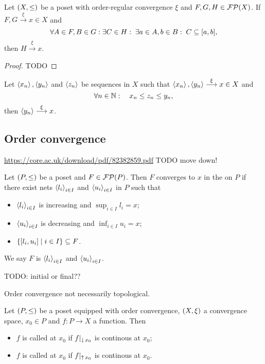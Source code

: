 \begin{proposition}
Let $\sSet{X,\leq}$ be a poset with order-regular convergence $\xi$ and $F,G,H\in \operatorname{\mathcal{FP}}(X)$. If $F,G\overset{\xi}{\longrightarrow} x\in X$ and
\[ \forall A\in F,B\in G: \exists C\in H: \;\exists a\in A, b\in B:\; C\subseteq \interval{a,b},  \]
then $H\overset{\xi}{\longrightarrow} x$.
\end{proposition}
\begin{proof}
TODO
\end{proof}
\begin{corollary}
Let $\left\langle x_n \right\rangle, \left\langle y_n \right\rangle$ and $\left\langle z_n \right\rangle$ be sequences in $X$ such that $\left\langle x_n \right\rangle, \left\langle y_n \right\rangle\overset{\xi}{\longrightarrow} x\in X$ and
\[ \forall n\in \mathbb{N}: \quad x_n \leq z_n \leq y_n, \]
then $\left\langle y_n \right\rangle \overset{\xi}{\longrightarrow} x$.
\end{corollary}

\subsection{Order convergence}
\url{https://core.ac.uk/download/pdf/82382859.pdf}
TODO move down!

\begin{definition}
Let $\sSet{P,\leq}$ be a poset and $F\in\operatorname{\mathcal{FP}}(P)$. Then $F$ converges to $x$ in the  on $P$ if there exist nets $\left\langle l_i \right\rangle_{i\in I}$ and $\left\langle u_i \right\rangle_{i\in I}$ in $P$ such that
\begin{itemize}
    \item $\left\langle l_i \right\rangle_{i\in I}$ is increasing and $\sup_{i\in I} l_i = x$;
    \item $\left\langle u_i \right\rangle_{i\in I}$ is decreasing and $\inf_{i\in I} u_i = x$;
    \item $\setbuilder{[l_i, u_i]}{i\in I} \subseteq F$.
\end{itemize}
We say $F$ is  $\left\langle l_i \right\rangle_{i\in I}$ and $\left\langle u_i \right\rangle_{i\in I}$.
\end{definition}

TODO: initial or final??

\begin{example}
Order convergence not necessarily topological.
\end{example}


\begin{definition}
Let $\sSet{P,\leq}$ be a poset equipped with order convergence, $\sSet{X,\xi}$ a convergence space, $x_0\in P$ and $f: P\to X$ a function. Then
\begin{itemize}
\item $f$ is called  at $x_0$ if $f|_{\operatorname{\downarrow} x_0}$ is continous at $x_0$;
\item $f$ is called  at $x_0$ if $f|_{\operatorname{\uparrow} x_0}$ is continous at $x_0$.
\end{itemize}
\end{definition}


